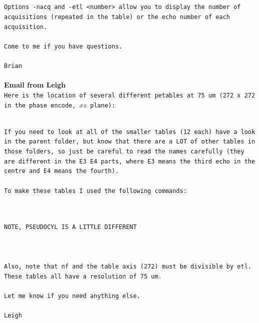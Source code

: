 \documentclass[11 pt]{article}
\newcommand{\bo}{\noindent\textbf}
\begin{document}
            \hfill\\\\
      	    \texttt{Options -nacq and -etl <number> allow you to display the number of acquisitions (repeated in the table) or the echo number of each acquisition.}\\\\
      	    \texttt{Come to me if you have questions.}\\\\
      	\texttt{Brian}\\\\

      
      \bo{Email from Leigh}\\
      	\texttt{Here is the location of several different petables at 75 um (272 x 272 in the phase encode, $xz$ plane):}\\\\


            
      	    \texttt{If you need to look at all of the smaller tables (12 each) have a look in the parent folder, but know that there are a LOT of other tables in those folders, so just be careful to read the names carefully (they are different in the E3 E4 parts, where E3 means the third echo in the centre and E4 means the fourth).}\\\\
      	    \texttt{To make these tables I used the following commands:}\\\\

      	    \\
            \texttt{NOTE, PSEUDOCYL IS A LITTLE DIFFERENT}\\\\
      	    \\\\
      	    \texttt{Also, note that nf and the table axis (272) must be divisible by etl. These tables all have a resolution of 75 um.}\\\\
      	    \texttt{Let me know if you need anything else.}\\\\
      	\texttt{Leigh}\\\\
\end{document}
